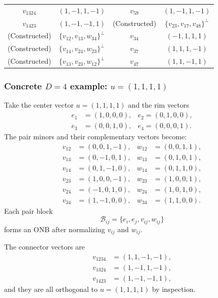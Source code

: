 \documentclass[%
  reprint,
  superscriptaddress,
  showpacs,
  showkeys,
  amsmath,amssymb,
  pra,
  longbibliography,
  floatfix,
  x11names
]{revtex4-2}
\newcommand{\rev}[1]{{#1}}
\begin{document}
\begin{table}[ht]
\begin{ruledtabular}
\begin{tabular}{cccc}
$v_{1324}$ & $(1,-1,1,-1)$ & $v_{59}$ & $(1,-1,1,-1)$ \\
$v_{1423}$ & $(1,-1,-1,1)$ & \rev{(Constructed)} & \rev{$\{v_{23},v_{17},v_{48}\}^\perp$} \\
\hline
(Constructed) & $\{v_{12}, v_{13}, w_{34}\}^\perp$ & $v_{34}$ & $(-1,1,1,1)$ \\
(Constructed) & $\{v_{14}, v_{24}, w_{23}\}^\perp$ & $v_{37}$ & $(1,1,1,-1)$ \\
\rev{(Constructed)} & \rev{$\{v_{13},v_{23},w_{12}\}^\perp$} & \rev{$v_{47}$} & \rev{$(1,1,-1,1)$} \\
\end{tabular}
\end{ruledtabular}
\end{table}





\subsubsection{Concrete $D=4$ example: $u=(1,1,1,1)$}

Take the center vector $u=(1,1,1,1)$ and the rim vectors
\begin{align*}
e_1&=(1,0,0,0),& e_2 =(0,1,0,0),\\
e_3&=(0,0,1,0),& e_4 =(0,0,0,1).
\end{align*}
The pair minors and their complementary vectors become:
\begin{align*}
v_{12}&=(0,0,1,-1), & w_{12}&=(0,0,1,1),\\
v_{13}&=(0,-1,0,1), & w_{13}&=(0,1,0,1),\\
v_{14}&=(0,1,-1,0), & w_{14}&=(0,1,1,0),\\
v_{23}&=(1,0,0,-1), & w_{23}&=(1,0,0,1),\\
v_{24}&=(-1,0,1,0), & w_{24}&=(1,0,1,0),\\
v_{34}&=(1,-1,0,0), & w_{34}&=(1,1,0,0).
\end{align*}
Each pair block
\[
\mathcal{B}_{ij}=\{e_i, e_j, v_{ij}, w_{ij}\}
\]
forms an ONB after normalizing $v_{ij}$ and $w_{ij}$.

The connector vectors are
\begin{align*}
v_{1234}&=(1,1,-1,-1),\\
v_{1324}& =(1,-1,1,-1),\\
v_{1423}&=(1,-1,-1,1),
\end{align*}
and they are all orthogonal to $u=(1,1,1,1)$ by inspection.
\end{document}
